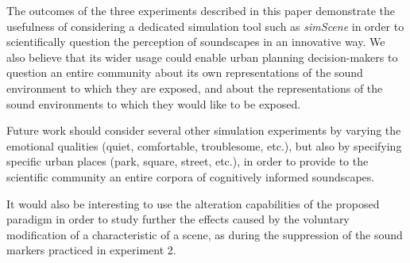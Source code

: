 \documentclass[twoside,twocolumn]{article}
\begin{document}

The outcomes of the three experiments described in this paper demonstrate the usefulness of considering a dedicated simulation tool such as \emph{simScene} in order to scientifically question the perception of soundscapes in an innovative way. We also believe that its wider usage could enable urban planning decision-makers to question an entire community about its own representations of the sound environment to which they are exposed, and about the representations of the sound environments to which they would like to be exposed.


Future work should consider several other simulation experiments by varying the emotional qualities (quiet, comfortable, troublesome, etc.), but also by specifying specific urban places (park, square, street, etc.), in order to provide to the scientific community an entire corpora of cognitively informed soundscapes.


It would also be interesting to use the alteration capabilities of the proposed paradigm in order to study further the effects caused by the voluntary modification of a characteristic of a scene, as during the suppression of the sound markers practiced in experiment 2.

\end{document}
